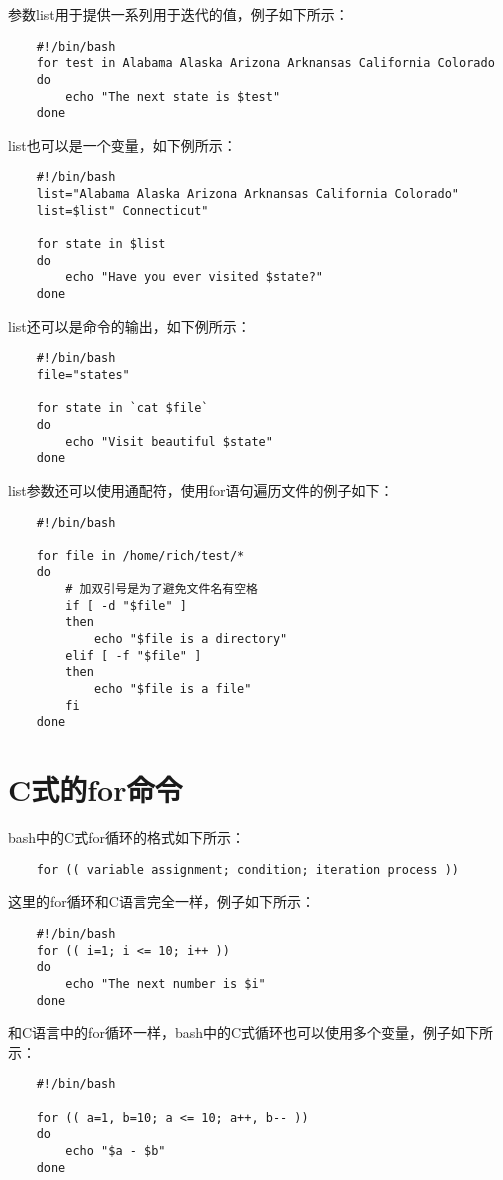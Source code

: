 \documentclass[a4paper,left=1.5cm,right=1.5cm,11pt]{article}
\begin{document}
	参数list用于提供一系列用于迭代的值，例子如下所示：
	\begin{lstlisting}
	#!/bin/bash
	for test in Alabama Alaska Arizona Arknansas California Colorado
	do
		echo "The next state is $test"
	done
	\end{lstlisting}

	list也可以是一个变量，如下例所示：
	\begin{lstlisting}
	#!/bin/bash
	list="Alabama Alaska Arizona Arknansas California Colorado"
	list=$list" Connecticut"

	for state in $list
	do
		echo "Have you ever visited $state?"
	done
	\end{lstlisting}

	list还可以是命令的输出，如下例所示：
	\begin{lstlisting}
	#!/bin/bash
	file="states"

	for state in `cat $file`
	do
		echo "Visit beautiful $state"
	done
	\end{lstlisting}

	list参数还可以使用通配符，使用for语句遍历文件的例子如下：
	\begin{lstlisting}
	#!/bin/bash

	for file in /home/rich/test/*
	do
		# 加双引号是为了避免文件名有空格
		if [ -d "$file" ]
		then
			echo "$file is a directory"
		elif [ -f "$file" ]
		then
			echo "$file is a file"
		fi
	done
	\end{lstlisting}

\section{C式的for命令}
	bash中的C式for循环的格式如下所示：
	\begin{lstlisting}
	for (( variable assignment; condition; iteration process ))
	\end{lstlisting}

	这里的for循环和C语言完全一样，例子如下所示：
	\begin{lstlisting}
	#!/bin/bash
	for (( i=1; i <= 10; i++ ))
	do
		echo "The next number is $i"
	done
	\end{lstlisting}

	和C语言中的for循环一样，bash中的C式循环也可以使用多个变量，例子如下所示：
	\begin{lstlisting}
	#!/bin/bash

	for (( a=1, b=10; a <= 10; a++, b-- ))
	do
		echo "$a - $b"
	done
	\end{lstlisting}
\end{document}
